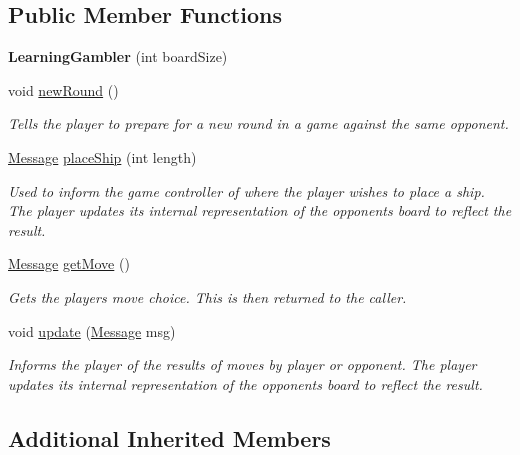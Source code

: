 \subsection*{Public Member Functions}
\begin{DoxyCompactItemize}
\item 
{\bfseries Learning\+Gambler} (int board\+Size)\hypertarget{classLearningGambler_ac19aaeb72ad651c3ff0d138f88e2803f}{}\label{classLearningGambler_ac19aaeb72ad651c3ff0d138f88e2803f}

\item 
void \hyperlink{classLearningGambler_ac1b46d154d2dfa2aba5f1dff5e8c37e0}{new\+Round} ()
\begin{DoxyCompactList}\small\item\em Tells the player to prepare for a new round in a game against the same opponent. \end{DoxyCompactList}\item 
\hyperlink{classMessage}{Message} \hyperlink{classLearningGambler_aaa1f666a184cb47ef8d7d6870654d5d1}{place\+Ship} (int length)
\begin{DoxyCompactList}\small\item\em Used to inform the game controller of where the player wishes to place a ship. The player updates its internal representation of the opponent\textquotesingle{}s board to reflect the result. \end{DoxyCompactList}\item 
\hyperlink{classMessage}{Message} \hyperlink{classLearningGambler_a4f3fe17dbd2368a8561117442bc1cc3e}{get\+Move} ()
\begin{DoxyCompactList}\small\item\em Gets the player\textquotesingle{}s move choice. This is then returned to the caller. \end{DoxyCompactList}\item 
void \hyperlink{classLearningGambler_a40f003de6770045d83167434ffd4d407}{update} (\hyperlink{classMessage}{Message} msg)
\begin{DoxyCompactList}\small\item\em Informs the player of the results of move\textquotesingle{}s by player or opponent. The player updates its internal representation of the opponent\textquotesingle{}s board to reflect the result. \end{DoxyCompactList}\end{DoxyCompactItemize}
\subsection*{Additional Inherited Members}


